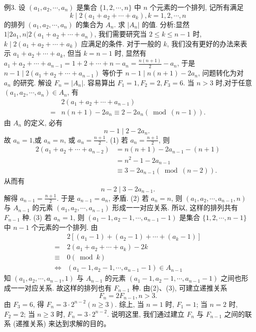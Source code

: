 例3. 设 $\left(a_1, a_2, \cdots, a_n\right)$ 是集合 $\{1,2, \cdots, n\}$ 中 $n$ 个元素的一个排列, 记所有满足
$$
k \mid 2\left(a_1+a_2+\cdots+a_k\right), k=1,2, \cdots, n
$$
的排列 $\left(a_1, a_2, \cdots, a_n\right)$ 的集合为 $A_n$. 求 $\left|A_n\right|$ 的值.
分析:显然 $1\left|2 a_1, n\right| 2\left(a_1+a_2+\cdots+a_n\right)$, 我们需要研究当 $2 \leqslant k \leqslant n-1$ 时, $k \mid 2\left(a_1+a_2+\cdots+a_k\right)$ 应满足的条件.
对于一般的 $k$, 我们没有更好的办法来表示 $a_1+a_2+\cdots+a_k$, 但当 $k=n-1$ 时, 显然有 $a_1+a_2+\cdots+ a_{n-1}=1+2+\cdots+n-a_n {=} \frac{n(n+1)}{2}-a_n$, 于是 $n-1 \mid 2\left(a_1+a_2+\cdots+a_{n-1}\right)$ 等价于 $n-1 \mid n(n+1)-2 a_n$, 问题转化为对 $a_n$ 的研究.
解设 $F_n=\left|A_n\right|$. 容易算出 $F_1=1, F_2=2, F_3=6$.
当 $n>3$ 时,对于任意 $\left(a_1, a_2, \cdots, a_n\right) \in A_n$, 有
$$
\begin{aligned}
& 2\left(a_1+a_2+\cdots+a_{n-1}\right) \\
= & n(n+1)-2 a_n \equiv 2-2 a_n(\bmod (n-1)) .
\end{aligned}
$$
由 $A_n$ 的定义, 必有
$$
n-1 \mid 2-2 a_n \text {. }
$$
故 $a_n=1$,或 $a_n=n$, 或 $a_n=\frac{n+1}{2}$.
(1) 若 $a_n=\frac{n+1}{2}$, 则
$$
\begin{aligned}
2\left(a_1+a_2+\cdots+a_{n-2}\right) & =n(n+1)-2 a_{n-1}-(n+1) \\
& =n^2-1-2 a_{n-1} \\
& \equiv 3-2 a_{n-1}(\bmod (n-2)) .
\end{aligned}
$$
从而有
$$
n-2 \mid 3-2 a_{n-1} .
$$
解得 $a_{n-1}=\frac{n+1}{2}$. 于是 $a_{n-1}=a_n$, 矛盾.
(2) 若 $a_n=n$, 则 $\left(a_1, a_2, \cdots, a_{n-1}, n\right)$ 与 $A_{n-1}$ 的元素 $\left(a_1, a_2, \cdots, a_{n-1}\right)$ 形成一一对应关系.
所以, 这样的排列共有 $F_{n-1}$ 种.
(3) 若 $a_n=1$, 则 $\left(a_1-1, a_2-1, \cdots, a_{n-1}-1\right)$ 是集合 $\{1,2, \cdots, n-1\}$ 中 $n-1$ 个元素的一个排列.
由
$$
\begin{aligned}
& 2\left[\left(a_1-1\right)+\left(a_2-1\right)+\cdots+\left(a_k-1\right)\right] \\
= & 2\left(a_1+a_2+\cdots+a_k\right)-2 k \\
\equiv & 0(\bmod k) \\
\Leftrightarrow & \left(a_1-1, a_2-1, \cdots, a_{n-1}-1\right) \in A_{n-1}
\end{aligned}
$$
知 $\left(a_1, a_2, \cdots, a_{n-1}, 1\right)$ 与 $A_{n-1}$ 的元素 $\left(a_1-1, a_2-1, \cdots, a_{n-1}-1\right)$ 之间也形成一一对应关系.
故这样的排列也有 $F_{n-1}$ 种.
由(2)、(3), 可建立递推关系
$$
F_n=2 F_{n-1}, n>3 .
$$
由 $F_3=6$, 得 $F_n=3 \cdot 2^{n-2}(n \geqslant 3)$.
综上, 当 $n=1$ 时, $F_1=1$; 当 $n=2$ 时, $F_2=2$; 当 $n \geqslant 3$ 时, $F_n=3 \cdot 2^{n-2}$.
说明这里, 我们通过建立 $F_n$ 与 $F_{n-1}$ 之间的联系 (递推关系) 来达到求解的目的。



